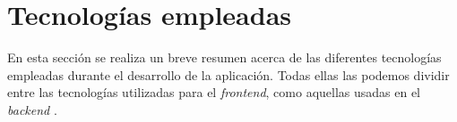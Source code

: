 \section{Tecnologías empleadas}

En esta sección se realiza un breve resumen acerca de las diferentes tecnologías empleadas durante el desarrollo de la aplicación. Todas ellas las podemos dividir entre las tecnologías utilizadas para el {\it frontend}, como aquellas usadas en el {\it backend} \cite{frontend}.


